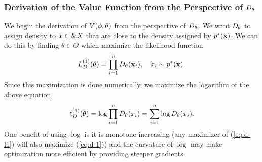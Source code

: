\subsubsection{Derivation of the Value Function from the Perspective of $D_\theta$}
\label{sec:derivation-d}

We begin the derivation of $V(\phi, \theta)$ from the perspective of $D_\theta$. We want
$D_\theta$ to assign density to $x \in \&X$ that are close to the
density assigned by $p^*(\mathbf{x})$. We can do this by finding
$\theta \in \Theta$ which maximize the likelihood function
\begin{align}
  \label{eq:d-1}
  L_{D}^{(1)}(\theta) = \prod_{i=1}^n D_\theta(\mathbf{x}_i), \quad x_i \sim p^*(\mathbf{x}).
\end{align}
Since this maximization is done numerically, we maximize the logarithm
of the above equation,
\begin{align}
  \label{eq:d-l1}
  \ell_{D}^{(1)}(\theta) = \log \prod_{i=1}^n D_\theta(x_i) = \sum_{i=1}^n \log D_\theta (x_i).
\end{align}
One benefit of using $\log$ is it is monotone increasing (any
maximizer of (\ref{eq:d-l1}) will also maximize (\ref{eq:d-1})) and
the curvature of $\log$ may make optimization more efficient by
providing steeper gradients.

